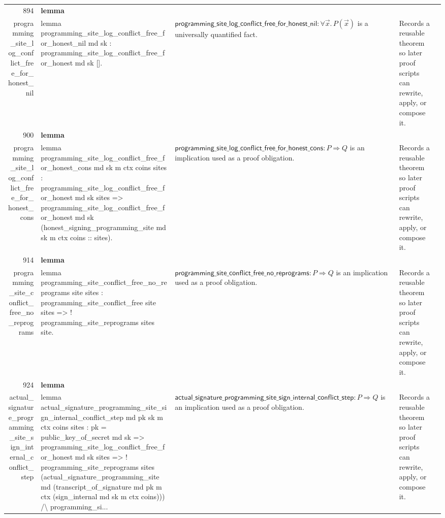 \documentclass[10pt]{article}
\newcommand{\ec}[1]{\begingroup\ttfamily\scriptsize #1\endgroup}
\begin{document}
\begin{longtable}{r L{0.17\textwidth} L{0.26\textwidth} L{0.27\textwidth} L{0.20\textwidth}}
894 & \textbf{lemma}\\\ec{programming\_site\_log\_conflict\_free\_for\_honest\_nil} & \ec{lemma programming\_site\_log\_conflict\_free\_for\_honest\_nil md sk : programming\_site\_log\_conflict\_free\_for\_honest md sk [].} & \(\mathsf{programming\_site\_log\_conflict\_free\_for\_honest\_nil} : \forall \vec{x}.\, P(\vec{x})\) is a universally quantified fact. & Records a reusable theorem so later proof scripts can rewrite, apply, or compose it. \\
900 & \textbf{lemma}\\\ec{programming\_site\_log\_conflict\_free\_for\_honest\_cons} & \ec{lemma programming\_site\_log\_conflict\_free\_for\_honest\_cons md sk m ctx coins sites : programming\_site\_log\_conflict\_free\_for\_honest md sk sites => programming\_site\_log\_conflict\_free\_for\_honest md sk (honest\_signing\_programming\_site md sk m ctx coins :: sites).} & \(\mathsf{programming\_site\_log\_conflict\_free\_for\_honest\_cons} : P \Rightarrow Q\) is an implication used as a proof obligation. & Records a reusable theorem so later proof scripts can rewrite, apply, or compose it. \\
914 & \textbf{lemma}\\\ec{programming\_site\_conflict\_free\_no\_reprograms} & \ec{lemma programming\_site\_conflict\_free\_no\_reprograms site sites : programming\_site\_conflict\_free site sites => ! programming\_site\_reprograms sites site.} & \(\mathsf{programming\_site\_conflict\_free\_no\_reprograms} : P \Rightarrow Q\) is an implication used as a proof obligation. & Records a reusable theorem so later proof scripts can rewrite, apply, or compose it. \\
924 & \textbf{lemma}\\\ec{actual\_signature\_programming\_site\_sign\_internal\_conflict\_step} & \ec{lemma actual\_signature\_programming\_site\_sign\_internal\_conflict\_step md pk sk m ctx coins sites : pk = public\_key\_of\_secret md sk => programming\_site\_log\_conflict\_free\_for\_honest md sk sites => ! programming\_site\_reprograms sites (actual\_signature\_programming\_site md (transcript\_of\_signature md pk m ctx (sign\_internal md sk m ctx coins))) /\textbackslash{} programming\_si...} & \(\mathsf{actual\_signature\_programming\_site\_sign\_internal\_conflict\_step} : P \Rightarrow Q\) is an implication used as a proof obligation. & Records a reusable theorem so later proof scripts can rewrite, apply, or compose it. \\

\end{longtable}
\end{document}
